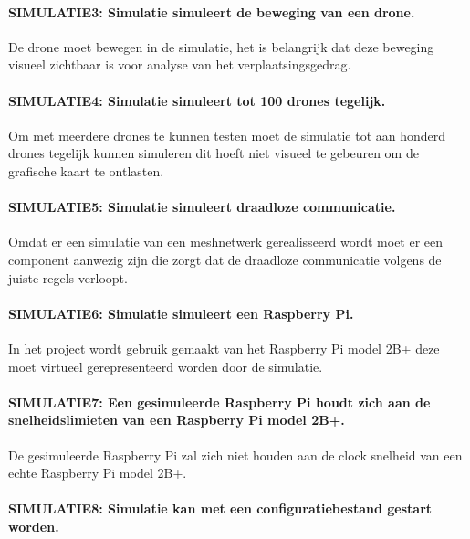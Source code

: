 \documentclass[a4paper, 11pt, oneside]{report}
\begin{document}
\paragraph{SIMULATIE3: Simulatie simuleert de beweging van een drone.}
\hypertarget{SIMULATIE3}{}

De drone moet bewegen in de simulatie, het is belangrijk dat deze beweging visueel zichtbaar is voor analyse van het verplaatsingsgedrag.

\paragraph{SIMULATIE4: Simulatie simuleert tot 100 drones tegelijk.}
\hypertarget{SIMULATIE4}{}

Om met meerdere drones te kunnen testen moet de simulatie tot aan honderd drones tegelijk kunnen simuleren dit hoeft niet visueel te gebeuren om de grafische kaart te ontlasten.

\paragraph{SIMULATIE5: Simulatie simuleert draadloze communicatie.}
\hypertarget{SIMULATIE5}{}

Omdat er een simulatie van een meshnetwerk gerealisseerd wordt moet er een component aanwezig zijn die zorgt dat de draadloze communicatie volgens de juiste regels verloopt.

\paragraph{SIMULATIE6: Simulatie simuleert een Raspberry Pi.}
\hypertarget{SIMULATIE6}{}

In het project wordt gebruik gemaakt van het Raspberry Pi model 2B+ deze moet virtueel gerepresenteerd worden door de simulatie.

\paragraph{SIMULATIE7: Een gesimuleerde Raspberry Pi houdt zich aan de snelheidslimieten van een Raspberry Pi model 2B+.}
\hypertarget{SIMULATIE7}{}

De gesimuleerde Raspberry Pi zal zich niet houden aan de clock snelheid van een echte Raspberry Pi model 2B+.

\paragraph{SIMULATIE8: Simulatie kan met een configuratiebestand gestart worden.}
\hypertarget{SIMULATIE8}{}
\end{document}
